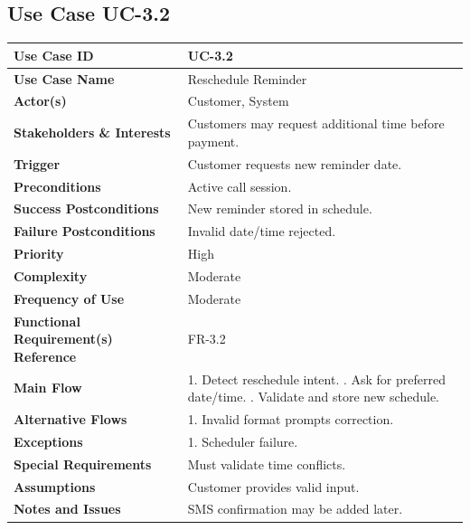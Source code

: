 \documentclass[12pt,a4paper]{report}
\begin{document}
\subsection*{Use Case UC-3.2}
\begin{longtable}{|p{4cm}|p{9cm}|}
\hline
\textbf{Use Case ID} & UC-3.2 \\ \hline
\textbf{Use Case Name} & Reschedule Reminder \\ \hline
\textbf{Actor(s)} & Customer, System \\ \hline
\textbf{Stakeholders \& Interests} & Customers may request additional time before payment. \\ \hline
\textbf{Trigger} & Customer requests new reminder date. \\ \hline
\textbf{Preconditions} & Active call session. \\ \hline
\textbf{Success Postconditions} & New reminder stored in schedule. \\ \hline
\textbf{Failure Postconditions} & Invalid date/time rejected. \\ \hline
\textbf{Priority} & High \\ \hline
\textbf{Complexity} & Moderate \\ \hline
\textbf{Frequency of Use} & Moderate \\ \hline
\textbf{Functional Requirement(s) Reference} & FR-3.2 \\ \hline
\textbf{Main Flow} &
1. Detect reschedule intent. \newline
2. Ask for preferred date/time. \newline
3. Validate and store new schedule. \\ \hline
\textbf{Alternative Flows} &
1. Invalid format prompts correction. \\ \hline
\textbf{Exceptions} &
1. Scheduler failure. \\ \hline
\textbf{Special Requirements} &
Must validate time conflicts. \\ \hline
\textbf{Assumptions} &
Customer provides valid input. \\ \hline
\textbf{Notes and Issues} &
SMS confirmation may be added later. \\ \hline
\end{longtable}

\end{document}
